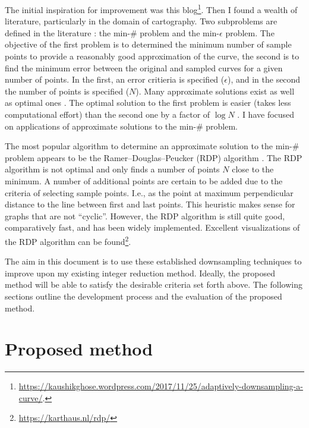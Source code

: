 \documentclass[a4paper,11pt]{article}
\begin{document}
The initial inspiration for improvement was this blog\footnote{\label{fn:blog}\url{https://kaushikghose.wordpress.com/2017/11/25/adaptively-downsampling-a-curve/}. \hfill}.
Then I found a wealth of literature, particularly in the domain of cartography.
Two subproblems are defined in the literature \citep{ImaiPolygonalApproximationsCurve1988}: the min-\# problem and the min-$\epsilon$ problem.
The objective of the first problem is to determined the minimum number of sample points to provide a reasonably good approximation of the curve, the second is to find the minimum error between the original and sampled curves for a given number of points.
In the first, an error critieria is specified ($\epsilon$), and in the second the number of points is specified ($N$).
Many approximate solutions exist \citep{Rameriterativeprocedurepolygonal1972,DouglasAlgorithmsreductionnumber1973,HeckbertSurveyPolygonalSurface1997} as well as optimal ones \citep{ImaiPolygonalApproximationsCurve1988,PerezOptimumpolygonalapproximation1994,ChanApproximationPolygonalCurves1996}.
The optimal solution to the first problem is easier (takes less computational effort) than the second one by a factor of $\log N$ \citep{ChanApproximationPolygonalCurves1996}.
I have focused on applications of approximate solutions to the min-\# problem.

The most popular algorithm to determine an approximate solution to the min-\# problem appears to be the Ramer–Douglas–Peucker (RDP) algorithm \citep{Rameriterativeprocedurepolygonal1972,DouglasAlgorithmsreductionnumber1973,HeckbertSurveyPolygonalSurface1997}.
The RDP algorithm is not optimal and only finds a number of points $N$ close to the minimum.
A number of additional points are certain to be added due to the criteria of selecting sample points.
I.e., as the point at maximum perpendicular distance to the line between first and last points.
This heuristic makes sense for graphs that are not ``cyclic''.
However, the RDP algorithm is still quite good, comparatively fast, and has been widely implemented.
Excellent visualizations of the RDP algorithm can be found\footnote{\url{https://karthaus.nl/rdp/}}.

The aim in this document is to use these established downsampling techniques to improve upon my existing integer reduction method.
Ideally, the proposed method will be able to satisfy the desirable criteria set forth above.
The following sections outline the development process and the evaluation of the proposed method.

\section{Proposed method}
\end{document}

